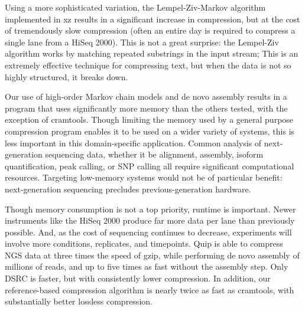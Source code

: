 \documentclass[twocolumn]{article}
\begin{document}
Using a more sophisticated variation, the Lempel-Ziv-Markov algorithm
implemented in xz results in a significant increase in compression, but at the
cost of tremendously slow compression (often an entire day is required to
compress a single lane from a HiSeq 2000). This is not a great surprise: the
Lempel-Ziv algorithm works by matching repeated substrings in the input
stream; This is an extremely effective technique for compressing text, but
when the data is not so highly structured, it breaks down.




Our use of high-order Markov chain models and de novo assembly results in a
program that uses significantly more memory than the others tested, with the
exception of cramtools. Though limiting the memory used by a general purpose
compression program enables it to be used on a wider variety of systems, this
is less important in this domain-specific application. Common analysis of
next-generation sequencing data, whether it be alignment, assembly, isoform
quantification, peak calling, or SNP calling all require significant
computational resources. Targeting low-memory systems would not be of
particular benefit: next-generation sequencing precludes previous-generation
hardware.

Though memory consumption is not a top priority, runtime is important. Newer
instruments like the HiSeq 2000 produce far more data per lane than previously
possible. And, as the cost of sequencing continues to decrease, experiments
will involve more conditions, replicates, and timepoints.  Quip is able to
compress NGS data at three times the speed of gzip, while performing de novo
assembly of millions of reads, and up to five times as fast without the
assembly step. Only DSRC is faster, but with consistently lower compression.
In addition, our reference-based compression algorithm is nearly twice as fast
as cramtools, with substantially better lossless compression.





\end{document}
